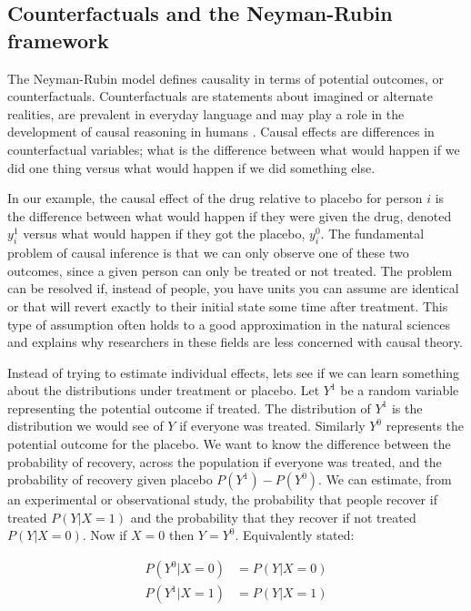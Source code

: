 \documentclass[11pt,a4paper]{article}
\begin{document}
\subsection{Counterfactuals and the Neyman-Rubin framework}

The Neyman-Rubin model \cite{Rubin1974,Rubin1978,Rosenbaum1983, Rubin2005,Rubin2008} defines causality in terms of potential outcomes, or counterfactuals. Counterfactuals are statements about imagined or alternate realities, are prevalent in everyday language and may play a role in the development of causal reasoning in humans \cite{Weisberg2013}. Causal effects are differences in counterfactual variables; what is the difference between what would happen if we did one thing versus what would happen if we did something else. 

In our example, the causal effect of the drug relative to placebo for person $i$ is the difference between what would happen if they were given the drug, denoted $y_{i}^{1}$ versus what would happen if they got the placebo, $y_{i}^{0}$. The fundamental problem of causal inference is that we can only observe one of these two outcomes, since a given person can only be treated or not treated. The problem can be resolved if, instead of people, you have units you can assume are identical or that will revert exactly to their initial state some time after treatment. This type of assumption often holds to a good approximation in the natural sciences and explains why researchers in these fields are less concerned with causal theory. 

Instead of trying to estimate individual effects, lets see if we can learn something about the distributions under treatment or placebo.  Let $Y^{1}$ be a random variable representing the potential outcome if treated. The distribution of $Y^{1}$ is the distribution we would see of $Y$ if everyone was treated. Similarly $Y^{0}$ represents the potential outcome for the placebo. We want to know the difference between the probability of recovery, across the population if everyone was treated, and the probability of recovery given placebo  $P(Y^{1})-P(Y^{0})$. We can estimate, from an experimental or observational study, the probability that people recover if treated $P(Y|X=1)$ and the probability that they recover if not treated $P(Y|X=0)$. Now if $X=0$ then $Y = Y^{0}$. Equivalently stated:

\begin{equation}
\begin{aligned}
P(Y^{0}|X=0)&= P(Y|X=0)\\
P(Y^{1}|X=1)&=P(Y|X=1)
\end{aligned}
\end{equation}
\end{document}
